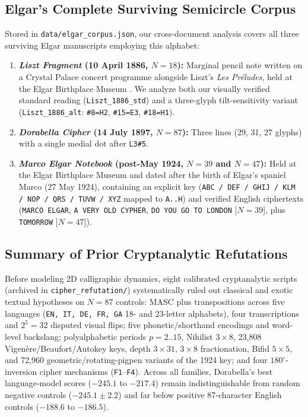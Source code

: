 \documentclass[10pt,a4paper,twocolumn]{article}
\newcommand{\code}[1]{\texttt{\small #1}}
\begin{document}
\subsection{Elgar's Complete Surviving Semicircle Corpus}
Stored in \code{data/elgar\_corpus.json}, our cross-document analysis covers all three surviving Elgar manuscripts employing this alphabet:
\begin{enumerate}
  \item \textbf{\emph{Liszt Fragment} (10 April 1886, $N=18$):} Marginal pencil note written on a Crystal Palace concert programme alongside Liszt's \emph{Les Pr\'eludes}, held at the Elgar Birthplace Museum \citep{bauer2017unsolved}. We analyze both our visually verified standard reading (\code{Liszt\_1886\_std}) and a three-glyph tilt-sensitivity variant (\code{Liszt\_1886\_alt}: \code{\#8=H2}, \code{\#15=E3}, \code{\#18=H1}).
  \item \textbf{\emph{Dorabella Cipher} (14 July 1897, $N=87$):} Three lines (29, 31, 27 glyphs) with a single medial dot after \code{L3\#5}.
  \item \textbf{\emph{Marco Elgar Notebook} (post-May 1924, $N=39$ and $N=47$):} Held at the Elgar Birthplace Museum and dated after the birth of Elgar's spaniel Marco (27 May 1924), containing an explicit key (\code{ABC / DEF / GHIJ / KLM / NOP / QRS / TUVW / XYZ} mapped to \code{A..H}) and verified English ciphertexts (\code{MARCO ELGAR}, \code{A VERY OLD CYPHER}, \code{DO YOU GO TO LONDON} [$N=39$], plus \code{TOMORROW} [$N=47$]).
\end{enumerate}

\subsection{Summary of Prior Cryptanalytic Refutations}
Before modeling 2D calligraphic dynamics, eight calibrated cryptanalytic scripts (archived in \code{cipher\_refutation/}) systematically ruled out classical and exotic textual hypotheses on $N=87$ controls: MASC plus transpositions across five languages (\code{EN, IT, DE, FR, GA} 18- and 23-letter alphabets), four transcriptions and $2^5 = 32$ disputed visual flips; five phonetic/shorthand encodings and word-level backslang; polyalphabetic periods $p=2..15$, Nihilist $3\times 8$, 23,808 Vigen\`ere/Beaufort/Autokey keys, depth $3\times 31$, $3\times 8$ fractionation, Bifid $5\times 5$, and 72,960 geometric/rotating-pigpen variants of the 1924 key; and four $180^\circ$-inversion cipher mechanisms (\code{F1}--\code{F4}). Across all families, Dorabella's best language-model scores ($-245.1$ to $-217.4$) remain indistinguishable from random negative controls ($-245.1 \pm 2.2$) and far below positive 87-character English controls ($-188.6$ to $-186.5$).
\end{document}
